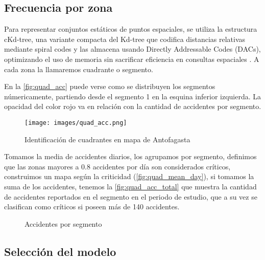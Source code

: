 \documentclass[12pt]{article}
\begin{document}

\subsection{Frecuencia por zona}

Para representar conjuntos estáticos de puntos espaciales, se utiliza la estructura cKd-tree, una variante compacta del Kd-tree que codifica distancias relativas mediante spiral codes y las almacena usando Directly Addressable Codes (DACs), optimizando el uso de memoria sin sacrificar eficiencia en consultas espaciales \parencite{gutierrez2023ckdtree}. A cada zona la llamaremos cuadrante o segmento.

En la \autoref{fig:quad_acc} puede verse como se distribuyen los segmentos númericamente, partiendo desde el segmento 1 en la esquina inferior izquierda. La opacidad del color rojo va en relación con la cantidad de accidentes por segmento.

\begin{figure}[H]
    \centering
    \texttt{[image: images/quad\_acc.png]}
    \caption{Identificación de cuadrantes en mapa de Antofagasta}
    \label{fig:quad_acc}
\end{figure}

Tomamos la media de accidentes diarios, los agrupamos por segmento, definimos que las zonas mayores a 0.8 accidentes por día son considerados críticos, construimos un mapa según la criticidad (\autoref{fig:quad_mean_day}), si tomamos la suma de los accidentes, tenemos la \autoref{fig:quad_acc_total} que muestra la cantidad de accidentes reportados en el segmento en el periodo de estudio, que a su vez se clasifican como críticos si poseen más de 140 accidentes.


\begin{figure}[H]
    \centering
    \caption{Accidentes por segmento}
\end{figure}




\subsection{Selección del modelo}
\end{document}
